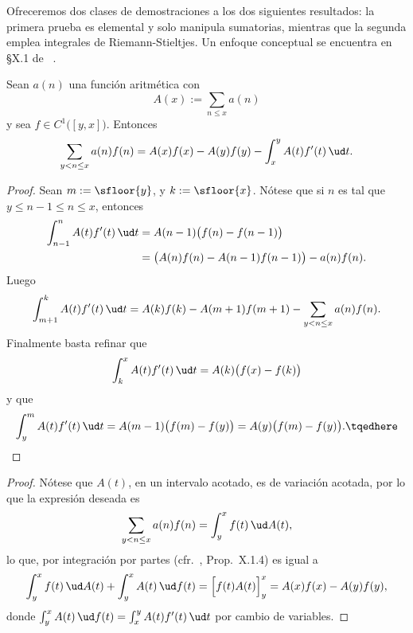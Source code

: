 \documentclass[teoria-numeros.tex]{subfiles}
\begin{document}
Ofreceremos dos clases de demostraciones a los dos siguientes resultados:
la primera prueba es elemental y solo manipula sumatorias, mientras que la segunda emplea integrales de Riemann-Stieltjes.
Un enfoque conceptual se encuentra en \S X.1 de \citeauthor{lang:analysis}~\cite[278\psqq]{lang:analysis}.
\begin{thm}
	Sean $a(n)$ una función aritmética con
	$$ A(x) := \sum_{n \le x} a(n) $$
	y sea $f \in C^1\big( [y, x] \big)$. Entonces
	$$ \sum_{y < n\le x} a(n)f(n) = A(x)f(x) - A(y)f(y) - \int_x^y A(t)f'(t) \, \ud t. $$
\end{thm}
\begin{proof}
	Sean $m := \sfloor{y}$, y $k := \sfloor{x}$.
	Nótese que si $n$ es tal que $y \le n-1 \le n \le x$, entonces
	\begin{align*}
		\int_{n-1}^{n} A(t)f'(t) \, \ud t &= A(n-1)\big( f(n) - f(n-1) \big) \\
		&= \big( A(n)f(n) - A(n-1)f(n-1) \big) - a(n)f(n).
	\end{align*}
	Luego
	$$ \int_{m+1}^{k} A(t)f'(t) \, \ud t = A(k)f(k) - A(m+1)f(m+1) - \sum_{y < n\le x} a(n)f(n). $$
	Finalmente basta refinar que
	$$ \int_{k}^{x} A(t)f'(t) \, \ud t = A(k)\big( f(x) - f(k) \big) $$
	y que
	\begin{equation}
		\int_{y}^{m} A(t)f'(t) \, \ud t = A(m-1)\big( f(m) - f(y) \big) = A(y)\big( f(m) - f(y) \big). \tqedhere
	\end{equation}
\end{proof}
\begin{proof}
	Nótese que $A(t)$, en un intervalo acotado, es de variación acotada, por lo que la expresión deseada es
	$$ \sum_{y < n \le x} a(n)f(n) = \int_{y}^{x} f(t) \, \ud A(t), $$
	lo que, por integración por partes (cfr.\ \cite[282]{lang:analysis}, Prop.~X.1.4) es igual a
	\[
		\int_{y}^{x} f(t) \, \ud A(t) + \int_{y}^{x} A(t) \, \ud f(t) = \Big[ f(t)A(t) \Big]_y^x = A(x)f(x) - A(y)f(y),
	\]
	donde $\int_{y}^{x} A(t) \, \ud f(t) = \int_{x}^{y} A(t)f'(t) \, \ud t$ por cambio de variables.
\end{proof}
\end{document}

